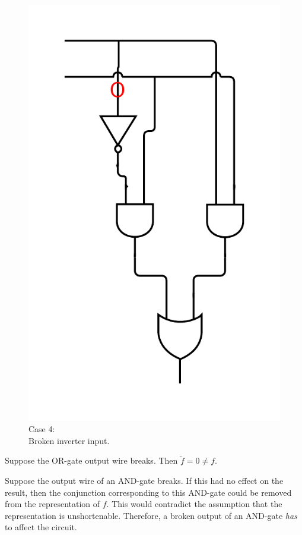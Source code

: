 \documentclass[10pt,a4paper]{scrartcl}
\begin{document}
\begin{figure}[h]
  \centering\includegraphics[width=\linewidth]{images/exercise_6_2_before_not.png}
  \caption{Case 4: \\Broken inverter input.}
  \endminipage
\end{figure}

 Suppose the OR-gate output wire breaks. Then $\check f = 0 \neq f$.

Suppose the output wire of an AND-gate breaks. 
If this had no effect on the result, then the conjunction corresponding to this AND-gate 
could be removed from the representation of $f$. This would contradict the assumption that
the representation is unshortenable. Therefore, a broken output of an AND-gate
\emph{has} to affect the circuit.
\end{document}
